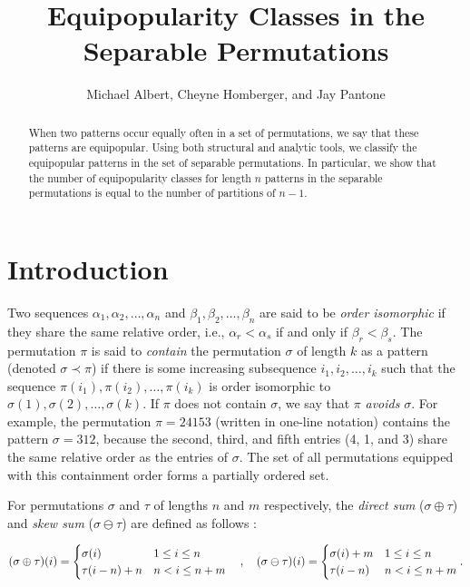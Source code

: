 \documentclass[10pt]{article}
\title{\sc Equipopularity Classes in the \\ Separable Permutations}
\author{%
Michael Albert, Cheyne Homberger, and Jay Pantone
}
\date{}
\theoremstyle{definition}
\numberwithin{equation}{section}
\numberwithin{figure}{section}
\begin{document}
\maketitle

\begin{abstract}
  When two patterns occur equally often in a set of permutations, we say that
  these patterns are equipopular. Using both structural and analytic tools, we
  classify the equipopular patterns in the set of separable permutations. In
  particular, we show that the number of equipopularity classes for length $n$ patterns
  in the separable permutations is equal to the number of partitions of $n-1$. 
\end{abstract}

\section{Introduction}

  Two sequences $\alpha_1, \alpha_2, \dots, \alpha_n$ and $\beta_1, \beta_2, \dots ,\beta_n$ are said to be \emph{order isomorphic} if they share the same relative order, i.e., $\alpha_r < \alpha_s$ if and only if $\beta_r < \beta_s$.  The permutation $\pi$ is said to \emph{contain} the permutation $\sigma$ of length $k$ as a pattern (denoted $\sigma \prec \pi$) if there is some increasing subsequence $i_1, i_2, \dots, i_k$ such that the sequence $\pi(i_1), \pi(i_2), \dots, \pi(i_k)$ is order isomorphic to $\sigma(1), \sigma(2), \dots, \sigma(k)$.  If $\pi$ does not contain $\sigma$, we say that $\pi$ \emph{avoids} $\sigma$.  For example, the permutation $\pi = 24153$ (written in one-line notation) contains the pattern $\sigma = 312$, because the second, third, and fifth entries (4, 1, and  3) share the same relative order as the entries of $\sigma$.  The set of all permutations equipped with this containment order forms a partially ordered set. 

For permutations $\sigma$ and $\tau$ of lengths $n$ and $m$ respectively, the \emph{direct sum} ($\sigma \oplus \tau$) and \emph{skew sum} ($\sigma \ominus \tau$) are defined as follows : 

\[
  (\sigma \oplus \tau)(i) = 
      \begin{cases}
      \sigma(i) & 1 \leq i \leq n  \\
      \tau(i-n) + n &  n < i \leq n+m 
      \end{cases}  \\ \quad , \quad
  (\sigma \ominus \tau)(i) = 
    \begin{cases}
      \sigma(i) + m & 1 \leq i \leq n \\
      \tau(i-n)  & n < i \leq n+m
      \end{cases} 
      .
\]
\end{document}
